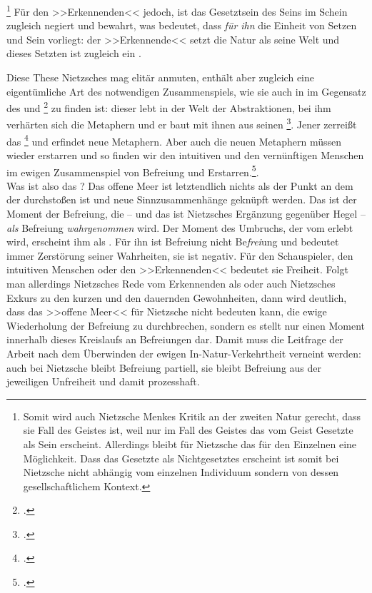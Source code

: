 \documentclass[12pt, a4paper, openany]{report}
\begin{document}
\footnote{
    Somit wird auch Nietzsche Menkes Kritik an der zweiten Natur gerecht, dass sie Fall des Geistes ist, weil nur im Fall des Geistes das vom Geist Gesetzte als Sein erscheint. 
    Allerdings bleibt für Nietzsche das für den Einzelnen eine Möglichkeit. 
    Dass das Gesetzte als Nichtgesetztes erscheint ist somit bei Nietzsche nicht abhängig vom einzelnen Individuum sondern von dessen gesellschaftlichem Kontext.
} 
Für den >>Erkennenden<< jedoch, ist das Gesetztsein des Seins im Schein zugleich negiert und bewahrt, was bedeutet, dass \emph{für ihn} die Einheit von Setzen und Sein vorliegt:
der >>Erkennende<< setzt die Natur als seine Welt und dieses Setzten ist zugleich ein . 

Diese These Nietzsches mag elitär anmuten, enthält aber zugleich eine eigentümliche Art des notwendigen Zusammenspiels, wie sie auch in  im Gegensatz des  und \footcite[][889]{nietzsche_geburt_1999} zu finden ist: 
dieser lebt in der Welt der Abstraktionen, bei ihm verhärten sich die Metaphern und er baut mit ihnen aus  seinen \footcite[][S. 882ff.]{nietzsche_geburt_1999}.
Jener zerreißt das \footcite[][S. 877ff.]{nietzsche_geburt_1999} und erfindet neue Metaphern.
Aber auch die neuen Metaphern müssen wieder erstarren und so finden wir den intuitiven und den vernünftigen Menschen im ewigen Zusammenspiel von Befreiung und Erstarren.\footcite[Vergleiche dazu auch: ][62]{stephan_nietzscheanismus_2019}.
\\

Was ist also das ?
Das offene Meer ist letztendlich nichts als der Punkt an dem der  durchstoßen ist und neue Sinnzusammenhänge geknüpft werden. 
Das  ist der Moment der Befreiung, die -- und das ist Nietzsches Ergänzung gegenüber Hegel -- \emph{als} Befreiung \emph{wahrgenommen} wird.
Der Moment des Umbruchs, der vom  erlebt wird, erscheint ihm als .
Für ihn ist Befreiung nicht Be\-\emph{frei}\-ung und bedeutet immer Zerstörung seiner Wahrheiten, sie ist negativ. 
Für den Schauspieler, den intuitiven Menschen oder den >>Erkennenden<< bedeutet sie Freiheit.
Folgt man allerdings Nietzsches Rede vom Erkennenden als  oder auch Nietzsches Exkurs zu den kurzen und den dauernden Gewohnheiten, dann wird deutlich, dass das >>offene Meer<< für Nietzsche nicht bedeuten kann, die ewige Wiederholung der Befreiung zu durchbrechen, sondern es stellt nur einen Moment innerhalb dieses Kreislaufs an Befreiungen dar. 
Damit muss die Leitfrage der Arbeit nach dem Überwinden der ewigen In-Natur-Verkehrtheit verneint werden:
auch bei Nietzsche bleibt Befreiung partiell, sie bleibt Befreiung aus der jeweiligen Unfreiheit und damit prozesshaft.
\end{document}
